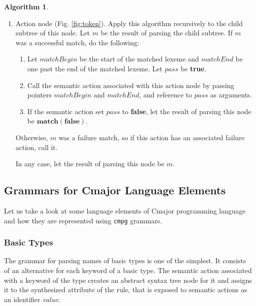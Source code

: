 \documentclass[a4paper,oneside,11pt]{book}
\theoremstyle{definition}
\newtheorem{algo}{Algorithm}[section]
\begin{document}
\begin{algo}
\begin{flushleft}
\begin{enumerate}
\item
Action node (Fig. \ref{fig:token}). Apply this algorithm recursively to the child subtree of this node.
Let $m$ be the result of parsing the child subtree.
If $m$ was a successful match, do the following:
\begin{enumerate}
\item
Let $matchBegin$ be the start of the matched lexeme and $matchEnd$ be one past the end of the matched lexeme.
Let $pass$ be \textbf{true}.
\item
Call the semantic action associated with this action node by passing pointers $matchBegin$ and $matchEnd$, and reference to $pass$ as arguments.
\item
If the semantic action set $pass$ to \textbf{false}, let the result of parsing this node be $\textbf{match}(\textbf{false})$.
\end{enumerate}
Otherwise, $m$ was a failure match, so if this action has an associated failure action, call it.

In any case, let the result of parsing this node be $m$.
\end{enumerate}

\end{flushleft}

\end{algo}

\clearpage
\subsection{Grammars for Cmajor Language Elements}

Let us take a look at some language elements of Cmajor programming language and
how they are represented using \verb|cmpg| grammars.

\subsubsection{Basic Types}

The grammar for parsing names of basic types is one of the simplest.
It consists of an alternative for each keyword of a basic type.
The semantic action associated with a keyword of the type creates an abstract syntax tree node for it and assigns
it to the synthesized attribute of the rule, that is exposed to semantic actions as an identifier \emph{value}:
\end{document}
